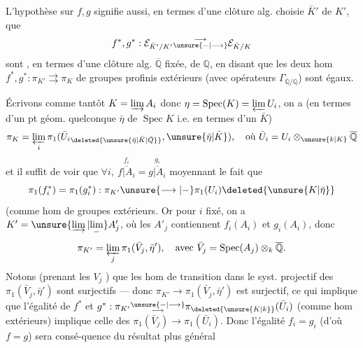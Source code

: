 L'hypothèse sur $f,g$ signifie aussi, en termes d'une clôture alg. choisie $\bar K'$  de $K'$, que  
\[
f^*,g^*:\mathcal E_{\bar K'/K'}\substack{\longrightarrow\\\unsure{-|\longrightarrow}}\mathcal E_{\bar K/K}
\]
sont , 
 en termes d'une clôture alg. $\overline{\mathbb Q}$ fixée, de $\mathbb Q$, en disant que les deux hom $f^*,g^*:\pi_{K'}\rightrightarrows\pi_K$ de groupes profinis extérieurs (avec opérateurs $\Gamma_{\overline{\mathbb Q}/\mathbb Q}$) sont égaux.

Écrivons comme tantôt $K=\varinjlim A_i$ donc  $\eta=\operatorname{Spec}(K)=\varprojlim U_i$, on a (en termes d'un pt géom. quelconque $\bar\eta$ de $\operatorname{Spec}K$ i.e. en termes d'un $\bar K$)
\[
\pi_K=\varprojlim_i\pi_1(\bar U_i{}_{\deleted{\unsure{\bar\eta|\bar K|\bar Q}}},\unsure{\bar\eta|\bar K}),\quad\text{où }\bar U_i=U_i\otimes_{\unsure{k|K}}\overline{\mathbb Q}
\]
et il suffit de voir que $\forall i,\ \overset{f_i}{\overline{f|A_i}}=\overset{g_i}{\overline{g|A_i}}$  moyennant le fait que
\[
\pi_1(f_i^*)=\pi_1(g_i^*):\pi_{K'}\unsure{\longrightarrow|-}\pi_1(U_i)\deleted{\unsure{K|\bar\eta}}
\]
(comme hom de groupes extérieurs. Or pour $i$ fixé, on a $K'=\unsure{\varinjlim|\underset{-}{\lim}} A'_j$, où les $A'_j$ contiennent $f_i(A_i)$ et $g_i(A_i)$, donc
\[
\pi_{K'}=\varprojlim_j\pi_1(\bar V_j,\bar\eta'),\quad\text{avec }\bar V_j=\operatorname{Spec}(A_j)\otimes_k\overline{\mathbb Q}.
\]
Notons (prenant les $V_j$ ) que les hom de transition dans le syst. projectif des $\pi_1(\bar V_j,\bar\eta')$ sont surjectifs --- donc  $\pi_{K'}\longrightarrow\pi_1(\bar V_j,\bar\eta')$ est surjectif, ce qui implique que l'égalité de $f^*$ et $g^*:\pi_{K'}\substack{\unsure{-|\longrightarrow}\\\longrightarrow}\pi_{\deleted{\unsure{K|k}}}(\bar U_i)$ (comme hom extérieurs) implique celle des $\pi_1(\bar V_j)\longrightarrow\pi_1(\bar U_i)$.
Donc l'égalité $f_i=g_i$ (d'où $f=g$) sera consé-quence du résultat plus général\unsure{,|;}

